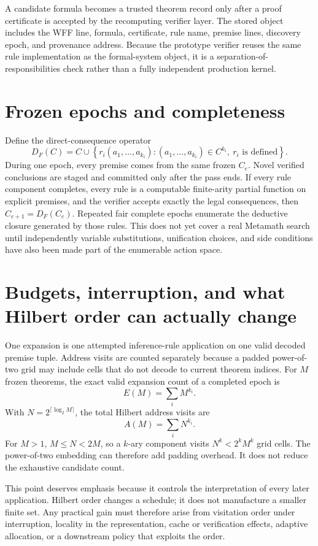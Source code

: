 \documentclass[11pt]{article}
\theoremstyle{hilberttheorem}
\begin{document}
A candidate formula becomes a trusted theorem record only after a proof certificate is accepted by the recomputing verifier layer. The stored object includes the WFF line, formula, certificate, rule name, premise lines, discovery epoch, and provenance address. Because the prototype verifier reuses the same rule implementation as the formal-system object, it is a separation-of-responsibilities check rather than a fully independent production kernel.

\section{Frozen epochs and completeness}\label{sec:frozen-epochs}
Define the direct-consequence operator
\[
D_F(C)=C\cup\left\{r_i(a_1,\ldots,a_{k_i}):
(a_1,\ldots,a_{k_i})\in C^{k_i},\ r_i\text{ is defined}\right\}.
\]
During one epoch, every premise comes from the same frozen $C_e$. Novel verified conclusions are staged and committed only after the pass ends. If every rule component completes, every rule is a computable finite-arity partial function on explicit premises, and the verifier accepts exactly the legal consequences, then $C_{e+1}=D_F(C_e)$. Repeated fair complete epochs enumerate the deductive closure generated by those rules. This does not yet cover a real Metamath search until independently variable substitutions, unification choices, and side conditions have also been made part of the enumerable action space.

\section{Budgets, interruption, and what Hilbert order can actually change}\label{sec:budgets}
One expansion is one attempted inference-rule application on one valid decoded premise tuple. Address visits are counted separately because a padded power-of-two grid may include cells that do not decode to current theorem indices. For $M$ frozen theorems, the exact valid expansion count of a completed epoch is
\[
E(M)=\sum_i M^{k_i}.
\]
With $N=2^{\lceil\log_2 M\rceil}$, the total Hilbert address visits are
\[
A(M)=\sum_i N^{k_i}.
\]
For $M>1$, $M\le N<2M$, so a $k$-ary component visits $N^k<2^kM^k$ grid cells. The power-of-two embedding can therefore add padding overhead. It does not reduce the exhaustive candidate count.

This point deserves emphasis because it controls the interpretation of every later application. Hilbert order changes a schedule; it does not manufacture a smaller finite set. Any practical gain must therefore arise from visitation order under interruption, locality in the representation, cache or verification effects, adaptive allocation, or a downstream policy that exploits the order.
\end{document}
